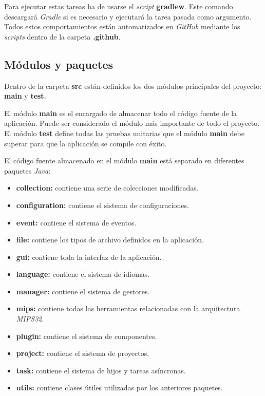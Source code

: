 \noindent Para ejecutar estas tareas ha de usarse el \textit{script} \textbf{gradlew}.
Este comando descargará \textit{Gradle} si es necesario y ejecutará
la tarea pasada como argumento.
Todos estos comportamientos están automatizados en \textit{GitHub}
mediante los \textit{scripts} dentro de la carpeta \textbf{.github}.

\subsection{Módulos y paquetes}\label{subsec:modulos-y-paquetes}

Dentro de la carpeta \textbf{src} están definidos los dos módulos principales del
proyecto: \textbf{main} y \textbf{test}.

\noindent El módulo \textbf{main} es el encargado de almacenar todo el código fuente
de la aplicación.
Puede ser considerado el módulo más importante de todo el proyecto.
El módulo \textbf{test} define todas las pruebas unitarias que el módulo \textbf{main}
debe superar para que la aplicación se compile con éxito.

\noindent El código fuente almacenado en el módulo \textbf{main} está separado en diferentes
paquetes \textit{Java}:
\begin{itemize}
    \item \textbf{collection:} contiene una serie de colecciones modificadas.
    \item \textbf{configuration:} contiene el sistema de configuraciones.
    \item \textbf{event:} contiene el sistema de eventos.
    \item \textbf{file:} contiene los tipos de archivo definidos en la aplicación.
    \item \textbf{gui:} contiene toda la interfaz de la aplicación.
    \item \textbf{language:} contiene el sistema de idiomas.
    \item \textbf{manager:} contiene el sistema de gestores.
    \item \textbf{mips:} contiene todas las herramientas relacionadas con la arquitectura \textit{MIPS32}.
    \item \textbf{plugin:} contiene el sistema de componentes.
    \item \textbf{project:} contiene el sistema de proyectos.
    \item \textbf{task:} contiene el sistema de hijos y tareas asíncronas.
    \item \textbf{utils:} contiene clases útiles utilizadas por los anteriores paquetes.
\end{itemize}


